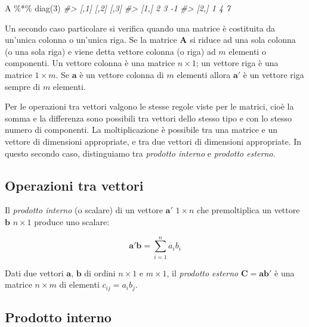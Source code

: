 \documentclass[
  11pt,
]{krantz}
\makeatletter
\newenvironment{Shaded}{\begin{snugshade}}{\end{snugshade}}
\newcommand{\CommentTok}[1]{\textcolor[rgb]{0.37,0.37,0.37}{\textit{#1}}}
\newcommand{\DecValTok}[1]{\textcolor[rgb]{0.06,0.06,0.06}{#1}}
\newcommand{\FunctionTok}[1]{\textcolor[rgb]{0,0,0}{#1}}
\newcommand{\NormalTok}[1]{#1}
\newcommand{\SpecialCharTok}[1]{\textcolor[rgb]{0,0,0}{#1}}
\newenvironment{kframe}{%
\medskip{}
\setlength{\fboxsep}{.8em}
 \def\at@end@of@kframe{}%
 \ifinner\ifhmode%
  \def\at@end@of@kframe{\end{minipage}}%
  \begin{minipage}{\columnwidth}%
 \fi\fi%
 \def\FrameCommand##1{\hskip\@totalleftmargin \hskip-\fboxsep
 \colorbox{shadecolor}{##1}\hskip-\fboxsep
     \hskip-\linewidth \hskip-\@totalleftmargin \hskip\columnwidth}%
 \MakeFramed {\advance\hsize-\width
   \@totalleftmargin\z@ \linewidth\hsize
   \@setminipage}}%
 {\par\unskip\endMakeFramed%
 \at@end@of@kframe}
\renewenvironment{Shaded}{\begin{kframe}}{\end{kframe}}
\theoremstyle{definition}
\theoremstyle{definition}
\theoremstyle{definition}
\theoremstyle{definition}
\theoremstyle{remark}
\makeatother
\begin{document}
\begin{Shaded}
\begin{Highlighting}[]
\NormalTok{A }\SpecialCharTok{\%*\%} \FunctionTok{diag}\NormalTok{(}\DecValTok{3}\NormalTok{)}
\CommentTok{\#\textgreater{}      [,1] [,2] [,3]}
\CommentTok{\#\textgreater{} [1,]    2    3   {-}1}
\CommentTok{\#\textgreater{} [2,]    1    4    7}
\end{Highlighting}
\end{Shaded}

Un secondo caso particolare si verifica quando una matrice è costituita da un'unica colonna o un'unica riga. Se la matrice \(\boldsymbol{A}\) si riduce ad una sola colonna (o una sola riga) e viene detta vettore colonna (o riga) ad \(m\) elementi o componenti. Un vettore colonna è una matrice \(n \times 1\); un vettore riga è una matrice \(1 \times m\). Se \(\boldsymbol{a}\) è un vettore colonna di \(m\) elementi allora \(\boldsymbol{a}'\) è un vettore riga sempre di \(m\) elementi.

Per le operazioni tra vettori valgono le stesse regole viste per le matrici, cioè la somma e la differenza sono possibili tra vettori dello stesso tipo e con lo stesso numero di componenti. La moltiplicazione è possibile tra una matrice e un vettore di dimensioni appropriate, e tra due vettori di dimensioni appropriate. In questo secondo caso, distinguiamo tra \emph{prodotto interno} e \emph{prodotto esterno}.

\hypertarget{operazioni-tra-vettori}{%
\subsection{Operazioni tra vettori}\label{operazioni-tra-vettori}}

Il \emph{prodotto interno} (o scalare) di un vettore \(\boldsymbol{a}'\) \(1 \times n\) che premoltiplica un vettore \(\boldsymbol{b}\) \(n \times 1\) produce uno scalare:

\[
\boldsymbol{a}'\boldsymbol{b} = \sum_{i=1}^{n}a_i b_i
\]

Dati due vettori \(\boldsymbol{a}\), \(\boldsymbol{b}\) di ordini \(n \times 1\) e \(m \times 1\), il \emph{prodotto esterno} \(\boldsymbol{C} = \boldsymbol{ab}'\) è una matrice \(n \times m\) di elementi \(c_{ij} = a_i b_j\).

\hypertarget{prodotto-interno}{%
\subsection{Prodotto interno}\label{prodotto-interno}}
\end{document}
